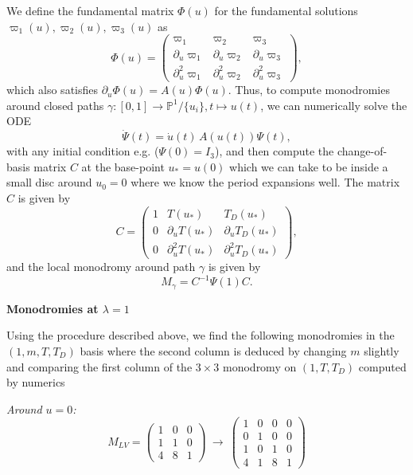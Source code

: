 \documentclass[11pt, a4paper]{article}
\numberwithin{equation}{section}
\begin{document}
We define the fundamental matrix $\Phi(u)$ for the fundamental solutions $\varpi_1(u), \varpi_2(u), \varpi_3(u)$ as
\begin{equation}
  \Phi(u) = \begin{pmatrix}
    \varpi_1 & \varpi_2 & \varpi_3 \\ \partial_u \varpi_1 & \partial_u \varpi_2 & \partial_u \varpi_3 \\ \partial_u^2 \varpi_1 & \partial_u^2 \varpi_2 & \partial_u^2 \varpi_3
  \end{pmatrix},
\end{equation}
which also satisfies $\partial_u \Phi(u) = A(u) \Phi(u)$. Thus, to compute monodromies around closed paths $\gamma: [0, 1] \to \mathbb{P}^1/\{u_i\},  t \mapsto u(t)$, we can numerically solve the ODE
\begin{equation}
  \dot{\Psi}(t) = \dot{u}(t) \, A(u(t)) \Psi(t),
\end{equation}
with any initial condition e.g. ($\Psi(0) = I_3$), and then compute the change-of-basis matrix $C$ at the base-point $u_* = u(0)$ which we can take to be inside a small disc around $u_0 = 0$ where we know the period expansions well. The matrix $C$ is given by
\begin{equation}
  C = \begin{pmatrix}
    1 & T(u_*) & T_D(u_*) \\ 0 & \partial_u T(u_*) & \partial_u T_D(u_*) \\ 0 & \partial_u^2 T(u_*) & \partial_u^2 T_D(u_*)
  \end{pmatrix},
\end{equation} 
and the local monodromy around path $\gamma$ is given by
\begin{equation}
  M_\gamma = C^{-1} \Psi(1) C.
\end{equation}

\textbf{Monodromies at $\lambda = 1$}

Using the procedure described above, we find the following monodromies in the $(1, m, T, T_D)$ basis where the second column is deduced by changing $m$ slightly and comparing the first column of the $3 \times 3$ monodromy on $(1, T, T_D)$ computed by numerics \par
\textit{Around $u = 0$:}
\begin{equation}
  M_{LV} = \begin{pmatrix}
    1 & 0 & 0 \\
    1 & 1 & 0 \\
    4 & 8 & 1
  \end{pmatrix} \ \to \ \begin{pmatrix}
    1 & 0 & 0 & 0 \\
    0 & 1 & 0 & 0 \\
    1 & 0 & 1 & 0 \\
    4 & 1 & 8 & 1
  \end{pmatrix}
\end{equation}
\end{document}
